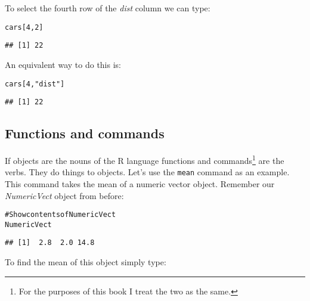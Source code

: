 \documentclass[ChapterTOCs,krantz1]{krantz}\usepackage{graphicx, color}
\makeatletter
\newcommand{\hlstring}[1]{\textcolor[rgb]{0.6,0.6,1}{#1}}%
\newcommand{\hlcomment}[1]{\textcolor[rgb]{0.180392156862745,0.6,0.341176470588235}{#1}}%
\newenvironment{kframe}{%
 \def\at@end@of@kframe{}%
 \ifinner\ifhmode%
  \def\at@end@of@kframe{\end{minipage}}%
  \begin{minipage}{\columnwidth}%
 \fi\fi%
 \def\FrameCommand##1{\hskip\@totalleftmargin \hskip-\fboxsep
 \colorbox{shadecolor}{##1}\hskip-\fboxsep
     \hskip-\linewidth \hskip-\@totalleftmargin \hskip\columnwidth}%
 \MakeFramed {\advance\hsize-\width
   \@totalleftmargin\z@ \linewidth\hsize
   \@setminipage}}%
 {\par\unskip\endMakeFramed%
 \at@end@of@kframe}
\newenvironment{knitrout}{}{} %
\makeatother
\begin{document}
\noindent To select the fourth row of the {\emph{dist}} column we can type:

\begin{knitrout}
\color{fgcolor}\begin{kframe}
\begin{alltt}
cars[4, 2]
\end{alltt}
\begin{verbatim}
## [1] 22
\end{verbatim}
\end{kframe}
\end{knitrout}


\noindent An equivalent way to do this is:

\begin{knitrout}
\color{fgcolor}\begin{kframe}
\begin{alltt}
cars[4, \hlstring{"dist"}]
\end{alltt}
\begin{verbatim}
## [1] 22
\end{verbatim}
\end{kframe}
\end{knitrout}


\subsection{Functions and commands}

If objects are the nouns of the R language functions and commands\footnote{For the purposes of this book I treat the two as the same.} are the verbs. They do things to objects. Let's use the \texttt{mean} command as an example. This command takes the mean of a numeric vector object. Remember our {\emph{NumericVect}} object from before:

\begin{knitrout}
\color{fgcolor}\begin{kframe}
\begin{alltt}
\hlcomment{# Show contents of NumericVect}
NumericVect
\end{alltt}
\begin{verbatim}
## [1]  2.8  2.0 14.8
\end{verbatim}
\end{kframe}
\end{knitrout}


\noindent To find the mean of this object simply type:
\end{document}
